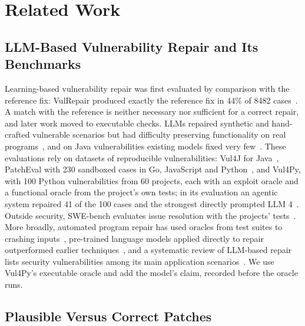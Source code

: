 \documentclass[ai,article,submit,oneauthor]{Definitions/mdpi}
\begin{document}
\section{Related Work}\label{sec:related}

\subsection{LLM-Based Vulnerability Repair and Its Benchmarks}

Learning-based vulnerability repair was first evaluated by comparison with the reference fix: VulRepair produced exactly the reference fix in 44\% of 8482 cases~\cite{Fu2022VulrepairT5Based}. A match with the reference is neither necessary nor sufficient for a correct repair, and later work moved to executable checks. LLMs repaired synthetic and hand-crafted vulnerable scenarios but had difficulty preserving functionality on real programs~\cite{Pearce2023ExaminingZeroShot}, and on Java vulnerabilities existing models fixed very few~\cite{Wu2023HowEffectiveAre}. These evaluations rely on datasets of reproducible vulnerabilities: Vul4J for Java~\cite{Bui2022Vul4jDatasetOf}, PatchEval with 230 sandboxed cases in Go, JavaScript and Python~\cite{Wei2025PatchevalNewBenchmark}, and Vul4Py, with 100 Python vulnerabilities from 60 projects, each with an exploit oracle and a functional oracle from the project's own tests; in its evaluation an agentic system repaired 41 of the 100 cases and the strongest directly prompted LLM 4~\cite{Bui2026Vul4pyBenchmarkingAutomated}. Outside security, SWE-bench evaluates issue resolution with the projects' tests~\cite{Jimenez2024SwebenchCanLanguage}. More broadly, automated program repair has used oracles from test suites to crashing inputs~\cite{Monperrus2018AutomaticSoftwareRepair}, pre-trained language models applied directly to repair outperformed earlier techniques~\cite{Xia2023AutomatedProgramRepair}, and a systematic review of LLM-based repair lists security vulnerabilities among its main application scenarios~\cite{Zhang2024SystematicLiteratureReview}. We use Vul4Py's executable oracle and add the model's claim, recorded before the oracle runs.

\subsection{Plausible Versus Correct Patches}
\end{document}
